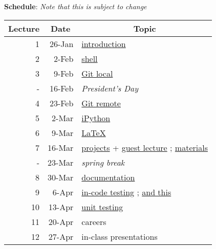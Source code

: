 \documentclass[12pt]{article}
\begin{document}
\clearpage
\noindent\textbf{Schedule}: \textit{Note that this is subject to change}\\
\begin{table}[htbp]
\begin{tabular}{|r|r|l|}
\hline
\multicolumn{1}{|c|}{Lecture} & \multicolumn{1}{c|}{Date} & \multicolumn{1}{c|}{Topic} \\ \hline
1 & 26-Jan & \href{http://rachelslaybaugh.github.io/ne24intro/#/}{introduction} \\ \hline
2 & 2-Feb & \href{https://github.com/rachelslaybaugh/shell-novice}{shell} \\ \hline
3 & 9-Feb & \href{https://github.com/rachelslaybaugh/git-novice}{Git local} \\ \hline
- & 16-Feb & \textit{President's Day} \\ \hline
4 & 23-Feb & \href{https://github.com/rachelslaybaugh/git-novice}{Git remote} \\ \hline
5 & 2-Mar & \href{https://githuhub.com/takluyver/ucb-ipython-intro.git}{iPython} \\ \hline
6 & 9-Mar & \href{https://github.com/rachelslaybaugh/NE24/tree/master/LaTeX}{\LaTeX} \\ \hline
7 & 16-Mar & \href{https://github.com/rachelslaybaugh/NE24/blob/master/project.md#presentation}{projects} + \href{http://thehackerwithin.github.io/berkeley/posts/numpy-vectorization/}{guest lecture} ; \href{https://github.com/thehackerwithin/berkeley/tree/master/python_logger}{materials}\\ \hline
- & 23-Mar & \textit{spring break} \\ \hline
8 & 30-Mar & \href{https://github.com/rachelslaybaugh/NE24/tree/master/documentation}{documentation} \\ \hline
9 & 6-Apr & \href{http://rachelslaybaugh.github.io/NE24/testing/Testing.pdf}{in-code testing} ; \href{http://rachelslaybaugh.github.io/NE24/testing/test-except.pdf}{and this} \\ \hline
10 & 13-Apr & \href{http://rachelslaybaugh.github.io/NE24/testing/Testing.pdf}{unit testing} \\ \hline
11 & 20-Apr & careers \\ \hline
12 & 27-Apr & in-class presentations \\ \hline
\end{tabular}
\end{table}
\end{document}
